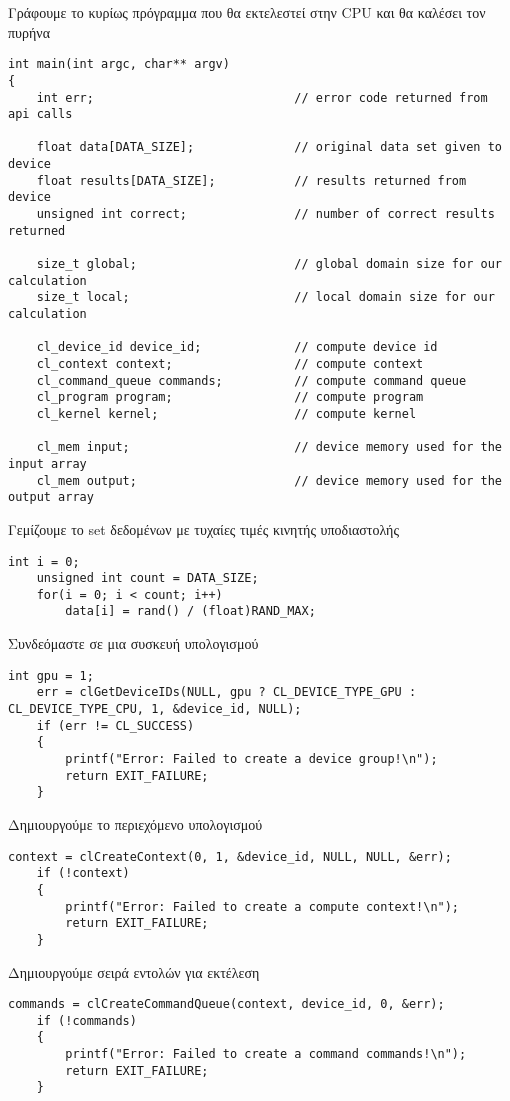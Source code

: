 Γράφουμε το κυρίως πρόγραμμα που θα εκτελεστεί στην CPU και θα καλέσει τον πυρήνα
\begin{lstlisting}[basicstyle=\scriptsize]
int main(int argc, char** argv)
{
    int err;                            // error code returned from api calls
      
    float data[DATA_SIZE];              // original data set given to device
    float results[DATA_SIZE];           // results returned from device
    unsigned int correct;               // number of correct results returned

    size_t global;                      // global domain size for our calculation
    size_t local;                       // local domain size for our calculation

    cl_device_id device_id;             // compute device id 
    cl_context context;                 // compute context
    cl_command_queue commands;          // compute command queue
    cl_program program;                 // compute program
    cl_kernel kernel;                   // compute kernel
    
    cl_mem input;                       // device memory used for the input array
    cl_mem output;                      // device memory used for the output array
\end{lstlisting}
Γεμίζουμε το set δεδομένων με τυχαίες τιμές κινητής υποδιαστολής
\begin{lstlisting}[basicstyle=\scriptsize]
    int i = 0;
    unsigned int count = DATA_SIZE;
    for(i = 0; i < count; i++)
        data[i] = rand() / (float)RAND_MAX;
\end{lstlisting}
Συνδεόμαστε σε μια συσκευή υπολογισμού
\begin{lstlisting}[basicstyle=\scriptsize]
    int gpu = 1;
    err = clGetDeviceIDs(NULL, gpu ? CL_DEVICE_TYPE_GPU : CL_DEVICE_TYPE_CPU, 1, &device_id, NULL);
    if (err != CL_SUCCESS)
    {
        printf("Error: Failed to create a device group!\n");
        return EXIT_FAILURE;
    }
\end{lstlisting}
Δημιουργούμε το περιεχόμενο υπολογισμού
\begin{lstlisting}[basicstyle=\scriptsize]
    context = clCreateContext(0, 1, &device_id, NULL, NULL, &err);
    if (!context)
    {
        printf("Error: Failed to create a compute context!\n");
        return EXIT_FAILURE;
    }
\end{lstlisting}
Δημιουργούμε σειρά εντολών για εκτέλεση
\begin{lstlisting}[basicstyle=\scriptsize]
    commands = clCreateCommandQueue(context, device_id, 0, &err);
    if (!commands)
    {
        printf("Error: Failed to create a command commands!\n");
        return EXIT_FAILURE;
    }
\end{lstlisting}
